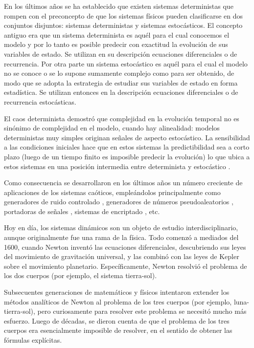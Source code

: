 En los últimos años se ha establecido que existen sistemas deterministas que rompen con el preconcepto de que los sistemas físicos pueden clasificarse en dos conjuntos disjuntos: sistemas deterministas y sistemas estocásticos.
El concepto antiguo era que un sistema determinista es aquél para el cual conocemos el modelo y por lo tanto es posible predecir con exactitud la evolución de sus variables de estado.
Se utilizan en su descripción ecuaciones diferenciales o de recurrencia.
Por otra parte un sistema estocástico es aquél para el cual el modelo no se conoce o se lo supone sumamente complejo como para ser obtenido, de modo que se adopta la estrategia de estudiar sus variables de estado en forma estadística.
Se utilizan entonces en la descripción ecuaciones diferenciales o de recurrencia estocásticas.

El caos determinista demostró que complejidad en la evolución temporal no es sinónimo de complejidad en el modelo, cuando hay alinealidad: modelos deterministas muy simples originan señales de aspecto estocástico.
La sensibilidad a las condiciones iniciales hace que en estos sistemas la predictibilidad sea a corto plazo (luego de un tiempo finito es imposible predecir la evolución) lo que ubica a estos sistemas en una posición intermedia entre determinista y estocástico \cite{Liao2013a}.

Como consecuencia se desarrollaron en los últimos años un número creciente de aplicaciones de los sistemas caóticos, empleándolos principalmente como generadores de ruido controlado \cite{DeMicco2007C}, generadores de números pseudoaleatorios \cite{DeMicco2007A}, portadoras de señales \cite{DeMicco2007B}, sistemas de encriptado \cite{Machado2004, Smaoui2009}, etc.

Hoy en día, los sistemas dinámicos son un objeto de estudio interdisciplinario, aunque originalmente fue una rama de la física.
Todo comenzó a mediados del 1600, cuando Newton inventó las ecuaciones diferenciales, descubriendo sus leyes del movimiento de gravitación universal, y las combinó con las leyes de Kepler sobre el movimiento planetario.
Específicamente, Newton resolvió el problema de los dos cuerpos (por ejemplo, el sistema tierra-sol).

Subsecuentes generaciones de matemáticos y físicos intentaron extender los métodos analíticos de Newton al problema de los tres cuerpos (por ejemplo, luna-tierra-sol), pero curiosamente para resolver este problema se necesitó mucho más esfuerzo.
Luego de décadas, se dieron cuenta de que el problema de los tres cuerpos era esencialmente imposible de resolver, en el sentido de obtener las fórmulas explícitas.

